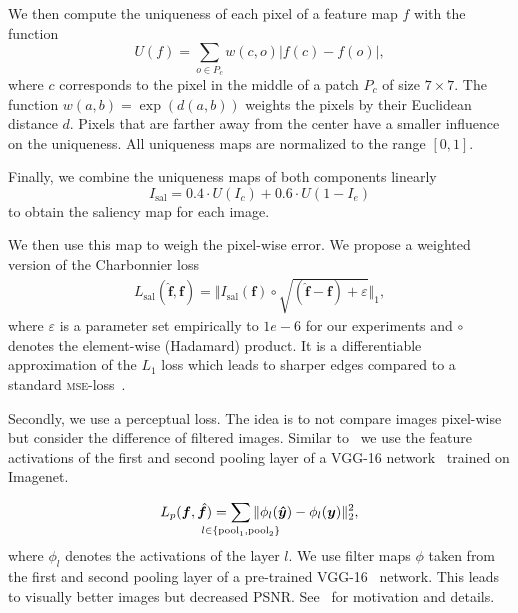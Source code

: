 \documentclass{scrartcl}
\newcommand{\img}{\bm{f}} %
\begin{document}
We then compute the uniqueness of each pixel of a feature map \(f\) with the function
\begin{equation}
  \label{eq:uniq}
  U(f) = \sum_{o \in P_c} w(c, o) \vert f(c) - f(o) \vert,
\end{equation}
where \(c\) corresponds to the pixel in the middle of a patch \(P_c\) of size \(7 \times 7\).
The function \(w(a,b) = \exp(d(a, b))\) weights the pixels by their Euclidean distance \(d\).
Pixels that are farther away from the center have a smaller influence on the uniqueness.
All uniqueness maps are normalized to the range \([0,1]\).

Finally, we combine the uniqueness maps of both components linearly
\begin{equation}
  \label{eq:saliency}
  I_{\text{sal}} = 0.4 \cdot U(I_c) + 0.6 \cdot U(1 - I_e)
\end{equation}
to obtain the saliency map for each image.

We then use this map to weigh the pixel-wise error.
We propose a weighted version of the Charbonnier loss
\begin{align}
\label{eq:charbonnier}
  L_{\text{sal}}( \hat{\bm{\img}}, \bm{\img}) = \Vert I_{\text{sal}}(\img) \circ \sqrt{ (\hat{\img} - \img) + \varepsilon} \Vert_1,
\end{align}
where $\varepsilon$ is a parameter set empirically to $1e-6$ for our experiments and \(\circ\) denotes the element-wise (Hadamard) product.
It is a differentiable approximation of the $L_1$ loss which leads to sharper edges compared to a standard \textsc{mse}-loss~\cite{LapSRN}.

Secondly, we use a perceptual loss.
The idea is to not compare images pixel-wise but consider the difference of filtered images.
Similar to~\cite{PerceptualLoss} we use the feature activations of the first and second pooling layer of a VGG-16 network~\cite{Vgg} trained on Imagenet.

\begin{equation}
  \label{eq:perceptual-loss}
  L_p(\img, \hat{\img}) = \sum_{\mathclap{l \in \{ \text{pool}_1, \text{pool}_2 \}}} \Vert \phi_l( \bm{\hat{y}} ) - \phi_l (\bm{y}) \Vert_2^2,
\end{equation}
where \(\phi_l\) denotes the activations of the layer \(l\).
We use filter maps $\phi$ taken from the first and second pooling layer of a pre-trained VGG-16~\cite{Vgg} network.
This leads to visually better images but decreased PSNR.
See~\cite{PerceptualLoss} for motivation and details.
\end{document}
